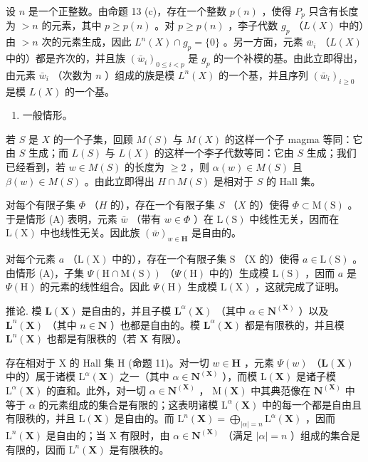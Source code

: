 设 \(n\) 是一个正整数。由命题 13 (c)，存在一个整数 \(p(n)\) ，使得 \(P_p\) 只含有长度为 \(>n\) 的元素，其中 \(p \geqslant p(n)\) 。对 \(p \geqslant p(n)\) ，李子代数 \(g_p\) （\(L(X)\) 中的）由 \(>n\) 次的元素生成，因此 \(L^n(X) \cap g_p = \{0\}\) 。另一方面，元素 \(\bar{w}_i\) （\(L(X)\) 中的）都是齐次的，并且族 \((\bar{w}_i)_{0 \leqslant i < p}\) 是 \(g_p\) 的一个补模的基。由此立即得出，由元素 \(\bar{w}_i\) （次数为 \(n\) ）组成的族是模 \(L^n(X)\) 的一个基，并且序列 \((\bar{w}_i)_{i \geqslant 0}\) 是模 \(L(X)\) 的一个基。

\begin{enumerate}
\def\labelenumi{(\Alph{enumi})}
\setcounter{enumi}{1}
\tightlist
\item
  一般情形。
\end{enumerate}

若 \(S\) 是 \(X\) 的一个子集，回顾 \(M(S)\) 与 \(M(X)\) 的这样一个子 magma 等同：它由 \(S\) 生成；而 \(L(S)\) 与 \(L(X)\) 的这样一个李子代数等同：它由 \(S\) 生成；我们已经看到，若 \(w \in M(S)\) 的长度为 \(\geqslant 2\) ，则 \(\alpha(w) \in M(S)\) 且 \(\beta(w) \in M(S)\) 。由此立即得出 \(H \cap M(S)\) 是相对于 \(S\) 的 Hall 集。

对每个有限子集 \(\Phi\) （\(H\) 的），存在一个有限子集 \(S\) （\(X\) 的）使得 \(\Phi \subset \mathrm{M}(\mathrm{S})\) 。于是情形 (A) 表明，元素 \(\bar{w}\) （带有 \(w \in \Phi\) ）在 \(\mathrm{L}(\mathrm{S})\) 中线性无关，因而在 \(\mathrm{L}(\mathrm{X})\) 中也线性无关。因此族 \((\bar{w})_{w \in \mathbf{H}}\) 是自由的。

对每个元素 \(a\) （\(\mathrm{L}(\mathrm{X})\) 中的），存在一个有限子集 \(\mathrm{S}\) （\(\mathrm{X}\) 的）使得 \(a \in \mathrm{L}(\mathrm{S})\) 。由情形 (A)，子集 \(\Psi(\mathrm{H} \cap \mathrm{M}(\mathrm{S}))\) （\(\Psi(\mathrm{H})\) 中的）生成模 \(\mathrm{L}(\mathrm{S})\) ，因而 \(a\) 是 \(\Psi(\mathrm{H})\) 的元素的线性组合。因此 \(\Psi(\mathrm{H})\) 生成模 \(\mathrm{L}(\mathrm{X})\) ，这就完成了证明。

推论. 模 \(\mathbf{L}(\mathbf{X})\) 是自由的，并且子模 \(\mathbf{L}^{\alpha}(\mathbf{X})\) （其中 \(\alpha \in \mathbf{N}^{(\mathbf{X})}\) ）以及 \(\mathbf{L}^n (\mathbf{X})\) （其中 \(n\in \mathbf{N}\) ）也都是自由的。模 \(\mathbf{L}^{\alpha}(\mathbf{X})\) 都是有限秩的，并且模 \(\mathbf{L}^n (\mathbf{X})\) 也都是有限秩的（若 \(\mathbf{X}\) 有限）。

存在相对于 X 的 Hall 集 H (命题 11)。对一切 \(w \in \mathbf{H}\) ，元素 \(\Psi(w)\) （\(\mathbf{L}(\mathbf{X})\) 中的）属于诸模 \(\mathrm{L}^{\alpha}(\mathbf{X})\) 之一（其中 \(\alpha \in \mathbf{N}^{(\mathbf{X})}\) ），而模 \(\mathrm{L}(\mathbf{X})\) 是诸子模 \(\mathrm{L}^{\alpha}(\mathbf{X})\) 的直和。此外，对一切 \(\alpha \in \mathbf{N}^{(\mathbf{X})}\) ， \(\mathrm{M}(\mathbf{X})\) 中其典范像在 \(\mathbf{N}^{(\mathbf{X})}\) 中等于 \(\alpha\) 的元素组成的集合是有限的；这表明诸模 \(\mathrm{L}^{\alpha}(\mathbf{X})\) 中的每一个都是自由且有限秩的，并且 \(\mathrm{L}(\mathbf{X})\) 是自由的。而 \(\mathrm{L}^{n}(\mathbf{X}) = \bigoplus_{|\alpha| = n} \mathrm{L}^{\alpha}(\mathbf{X})\) ，因而 \(\mathrm{L}^{n}(\mathbf{X})\) 是自由的；当 X 有限时，由 \(\alpha \in \mathbf{N}^{(\mathbf{X})}\) （满足 \(|\alpha| = n\) ）组成的集合是有限的，因而 \(\mathrm{L}^{n}(\mathbf{X})\) 是有限秩的。

